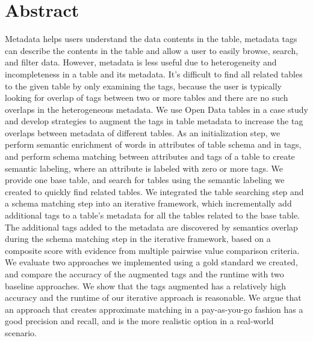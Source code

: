 
\chapter{Abstract}
Metadata helps users understand the data contents in the table, metadata tags can describe the contents in the table and allow a user to easily browse, search, and filter data. However, metadata is less useful due to heterogeneity and incompleteness in a table and its metadata. It's difficult to find all related tables to the given table by only examining the tags, because the user is typically looking for overlap of tags between two or more tables and there are no such overlaps in the heterogeneous metadata. We use Open Data tables in a case study and develop strategies to augment the tags in table metadata to increase the tag overlaps between metadata of different tables. As an initialization step, we perform semantic enrichment of words in attributes of table schema and in tags, and perform schema matching between attributes and tags of a table to create semantic labeling, where an attribute is labeled with zero or more tags. We provide one base table, and search for tables using the semantic labeling we created to quickly find related tables. We integrated the table searching step and a schema matching step into an iterative framework, which incrementally add additional tags to a table’s metadata for all the tables related to the base table. The additional tags added to the metadata are discovered by semantics overlap during the schema matching step in the iterative framework, based on a composite score with evidence from multiple pairwise value comparison criteria. We evaluate two approaches we implemented using a gold standard we created, and compare the accuracy of the augmented tags and the runtime with two baseline approaches. We show that the tags augmented has a relatively high accuracy and the runtime of our iterative approach is reasonable. We argue that an approach that creates approximate matching in a pay-as-you-go fashion has a good precision and recall, and is the more realistic option in a real-world scenario.
\endinput